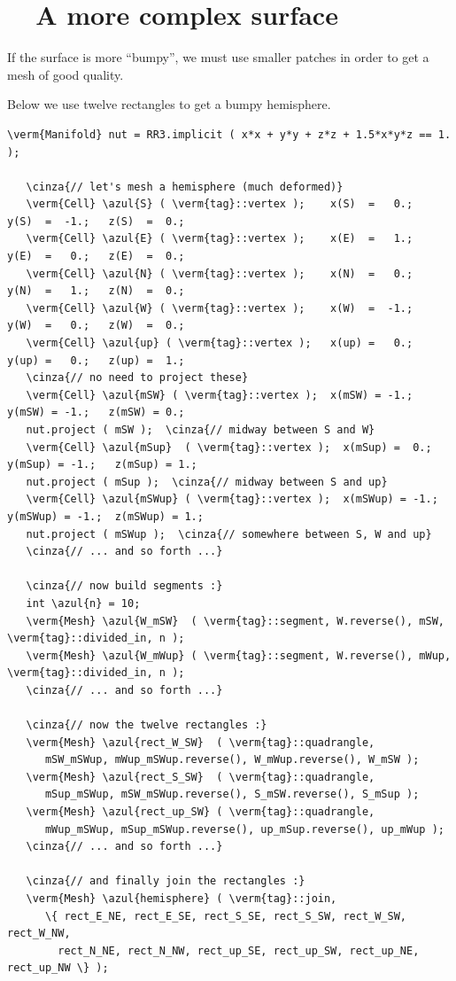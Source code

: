 \section{~~A more complex surface}\label{\numb section 2.\numb parag 6}

If the surface is more ``bumpy'',
we must use smaller patches in order to get a mesh of good quality.

Below we use twelve rectangles to get a bumpy hemisphere.

\begin{Verbatim}[commandchars=\\\{\},formatcom=\small\tt,frame=single,
   label=parag-\ref{\numb section 2.\numb parag 6}.cpp,rulecolor=\color{coment},
   baselinestretch=0.94,framesep=2mm]
   \verm{Manifold} nut = RR3.implicit ( x*x + y*y + z*z + 1.5*x*y*z == 1. );

   \cinza{// let's mesh a hemisphere (much deformed)}
   \verm{Cell} \azul{S} ( \verm{tag}::vertex );    x(S)  =   0.;   y(S)  =  -1.;   z(S)  =  0.;
   \verm{Cell} \azul{E} ( \verm{tag}::vertex );    x(E)  =   1.;   y(E)  =   0.;   z(E)  =  0.;
   \verm{Cell} \azul{N} ( \verm{tag}::vertex );    x(N)  =   0.;   y(N)  =   1.;   z(N)  =  0.;
   \verm{Cell} \azul{W} ( \verm{tag}::vertex );    x(W)  =  -1.;   y(W)  =   0.;   z(W)  =  0.;
   \verm{Cell} \azul{up} ( \verm{tag}::vertex );   x(up) =   0.;   y(up) =   0.;   z(up) =  1.;
   \cinza{// no need to project these}
   \verm{Cell} \azul{mSW} ( \verm{tag}::vertex );  x(mSW) = -1.;   y(mSW) = -1.;   z(mSW) = 0.;
   nut.project ( mSW );  \cinza{// midway between S and W}
   \verm{Cell} \azul{mSup}  ( \verm{tag}::vertex );  x(mSup) =  0.;   y(mSup) = -1.;   z(mSup) = 1.;
   nut.project ( mSup );  \cinza{// midway between S and up}
   \verm{Cell} \azul{mSWup} ( \verm{tag}::vertex );  x(mSWup) = -1.;  y(mSWup) = -1.;  z(mSWup) = 1.;
   nut.project ( mSWup );  \cinza{// somewhere between S, W and up}
   \cinza{// ... and so forth ...}
	
   \cinza{// now build segments :}
   int \azul{n} = 10;
   \verm{Mesh} \azul{W_mSW}  ( \verm{tag}::segment, W.reverse(), mSW,  \verm{tag}::divided_in, n );
   \verm{Mesh} \azul{W_mWup} ( \verm{tag}::segment, W.reverse(), mWup, \verm{tag}::divided_in, n );
   \cinza{// ... and so forth ...}

   \cinza{// now the twelve rectangles :}
   \verm{Mesh} \azul{rect_W_SW}  ( \verm{tag}::quadrangle,
      mSW_mSWup, mWup_mSWup.reverse(), W_mWup.reverse(), W_mSW );
   \verm{Mesh} \azul{rect_S_SW}  ( \verm{tag}::quadrangle,
      mSup_mSWup, mSW_mSWup.reverse(), S_mSW.reverse(), S_mSup );
   \verm{Mesh} \azul{rect_up_SW} ( \verm{tag}::quadrangle,
      mWup_mSWup, mSup_mSWup.reverse(), up_mSup.reverse(), up_mWup );
   \cinza{// ... and so forth ...}

   \cinza{// and finally join the rectangles :}
   \verm{Mesh} \azul{hemisphere} ( \verm{tag}::join,
      \{ rect_E_NE, rect_E_SE, rect_S_SE, rect_S_SW, rect_W_SW, rect_W_NW,
        rect_N_NE, rect_N_NW, rect_up_SE, rect_up_SW, rect_up_NE, rect_up_NW \} );
\end{Verbatim}

